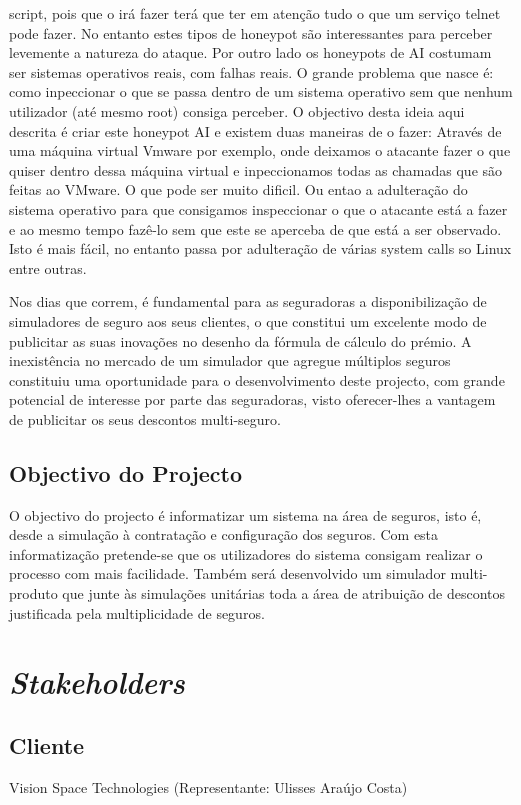 script, pois que o irá fazer terá que ter em atenção tudo o que um serviço telnet pode fazer. No entanto estes tipos
de honeypot são interessantes para perceber levemente a natureza do ataque.
Por outro lado os honeypots de AI costumam ser sistemas operativos reais, com falhas reais. O grande problema
que nasce é: como inpeccionar o que se passa dentro de um sistema operativo sem que nenhum utilizador (até
mesmo root) consiga perceber.
O objectivo desta ideia aqui descrita é criar este honeypot AI e existem duas maneiras de o fazer:
Através de uma máquina virtual Vmware por exemplo, onde deixamos o atacante fazer o que quiser dentro dessa
máquina virtual e inpeccionamos todas as chamadas que são feitas ao VMware. O que pode ser muito dificil.
Ou entao a adulteração do sistema operativo para que consigamos inspeccionar o que o atacante está a fazer e ao
mesmo tempo fazê-lo sem que este se aperceba de que está a ser observado. Isto é mais fácil, no entanto passa por
adulteração de várias system calls so Linux entre outras.

Nos dias que correm, é fundamental para as seguradoras a disponibilização de simuladores de seguro aos seus clientes, o que constitui um excelente modo de publicitar as suas inovações no desenho da fórmula de cálculo do prémio.
A inexistência no mercado de um simulador que agregue múltiplos seguros constituiu uma oportunidade para o desenvolvimento deste projecto, com grande potencial de interesse por parte das seguradoras, visto oferecer-lhes a vantagem de publicitar os seus descontos multi-seguro.
\subsection{Objectivo do Projecto}
O objectivo do projecto é informatizar um sistema na área de seguros, isto é, desde a simulação à contratação e configuração dos seguros. Com esta informatização pretende-se que os utilizadores do sistema consigam realizar o processo com mais facilidade. Também será desenvolvido um simulador multi-produto que junte às simulações unitárias toda a área de atribuição de descontos justificada pela multiplicidade de seguros.

\section{\emph{Stakeholders}}

\subsection{Cliente}
Vision Space Technologies (Representante: Ulisses Araújo Costa)

